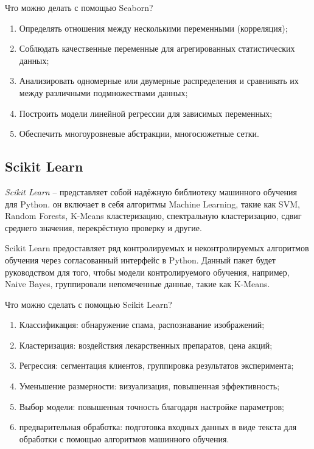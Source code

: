 Что можно делать с помощью Seaborn?

\begin{enumerate}
	\item Определять отношения между несколькими переменными (корреляция);
	\item Соблюдать качественные переменные для агрегированных статистических данных;
	\item Анализировать одномерные или двумерные распределения и сравнивать их между различными подмножествами данных;
	\item Построить модели линейной регрессии для зависимых переменных;	
	\item Обеспечить многоуровневые абстракции, многосюжетные сетки.
\end{enumerate}

\subsection{Scikit Learn}

\textit{Scikit Learn} -- представляет собой надёжную библиотеку машинного обучения для Python. он включает в себя алгоритмы Machine Learning, такие как SVM, Random Forests, K-Means кластеризацию, спектральную кластеризацию, сдвиг среднего значения, перекрёстную проверку и другие. 

Scikit Learn предоставляет ряд контролируемых и неконтролируемых алгоритмов обучения через согласованный интерфейс в Python. Данный пакет будет руководством для того, чтобы модели контролируемого обучения, например, Naive Bayes, группировали непомеченные данные, такие как K-Means.

Что можно сделать с помощью Scikit Learn?

\begin{enumerate}
	\item Классификация: обнаружение спама, распознавание изображений;
	\item Кластеризация: воздействия лекарственных препаратов, цена акций;
	\item Регрессия: сегментация клиентов, группировка результатов эксперимента;
	\item Уменьшение размерности: визуализация, повышенная эффективность;
	\item Выбор модели: повышенная точность благодаря настройке параметров;
	\item предварительная обработка: подготовка входных данных в виде текста для обработки с помощью алгоритмов машинного обучения.
\end{enumerate}


